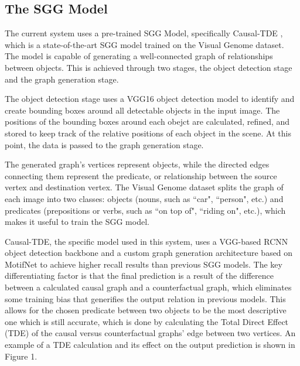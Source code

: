 \documentclass[letterpaper, 10 pt, conference]{ieeeconf}  %
\begin{document}
    \subsection*{The SGG Model}
        The current system uses a pre-trained SGG Model, specifically Causal-TDE \cite{tang2020sggcode}, which is a state-of-the-art SGG model trained on the Visual Genome dataset. The model is capable of generating a well-connected graph of relationships between objects. This is achieved through two stages, the object detection stage and the graph generation stage.
        
        The object detection stage uses a VGG16 object detection model to identify and create bounding boxes around all detectable objects in the input image. The positions of the bounding boxes around each obejct are calculated, refined, and stored to keep track of the relative positions of each object in the scene. At this point, the data is passed to the graph generation stage.
        
        The generated graph's vertices represent objects, while the directed edges connecting them represent the predicate, or relationship between the source vertex and destination vertex. The Visual Genome dataset splits the graph of each image into two classes: objects (nouns, such as ``car", ``person", etc.) and predicates (prepositions or verbs, such as ``on top of", ``riding on", etc.), which makes it useful to train the SGG model. 
        
        Causal-TDE, the specific model used in this system, uses a VGG-based RCNN object detection backbone and a custom graph generation architecture based on MotifNet to achieve higher recall results than previous SGG models. The key differentiating factor is that the final prediction is a result of the difference between a calculated causal graph and a counterfactual graph, which eliminates some training bias that generifies the output relation in previous models. This allows for the chosen predicate between two objects to be the most descriptive one which is still accurate, which is done by calculating the Total Direct Effect (TDE) of the causal versus counterfactual graphs' edge between two vertices. An example of a TDE calculation and its effect on the output prediction is shown in Figure 1.
\end{document}
